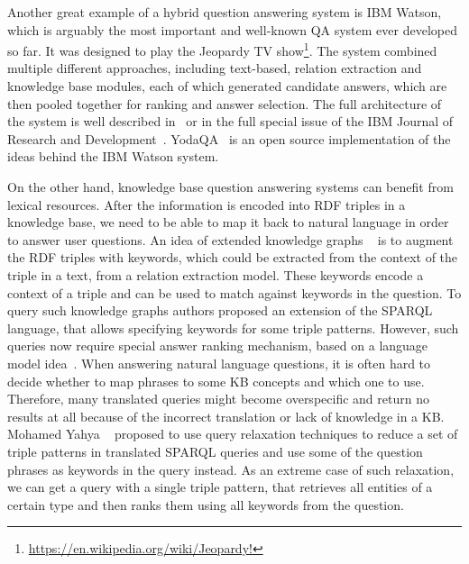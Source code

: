 Another great example of a hybrid question answering system is IBM Watson, which is arguably the most important and well-known QA system ever developed so far.
It was designed to play the Jeopardy TV show\footnote{\href{url}{https://en.wikipedia.org/wiki/Jeopardy!}}.
The system combined multiple different approaches, including text-based, relation extraction and knowledge base modules, each of which generated candidate answers, which are then pooled together for ranking and answer selection.
The full architecture of the system is well described in~\cite{ferrucci2010building} or in the full special issue of the IBM Journal of Research and Development~\cite{ibm_watson_special_issue}.
YodaQA~\cite{baudivs2015yodaqa} is an open source implementation of the ideas behind the IBM Watson system.

On the other hand, knowledge base question answering systems can benefit from lexical resources.
After the information is encoded into RDF triples in a knowledge base, we need to be able to map it back to natural language in order to answer user questions.
An idea of extended knowledge graphs ~\cite{elbassuoni2009language,yahya2013robust} is to augment the RDF triples with keywords, which could be extracted from the context of the triple in a text, \eg from a relation extraction model.
These keywords encode a context of a triple and can be used to match against keywords in the question.
To query such knowledge graphs authors proposed an extension of the SPARQL language, that allows specifying keywords for some triple patterns.
However, such queries now require special answer ranking mechanism, \eg based on a language model idea~\cite{elbassuoni2009language}.
When answering natural language questions, it is often hard to decide whether to map phrases to some KB concepts and which one to use.
Therefore, many translated queries might become overspecific and return no results at all because of the incorrect translation or lack of knowledge in a KB.
Mohamed Yahya \etal~\cite{yahya2013robust,yahya2016relationship} proposed to use query relaxation techniques to reduce a set of triple patterns in translated SPARQL queries and use some of the question phrases as keywords in the query instead.
As an extreme case of such relaxation, we can get a query with a single triple pattern, that retrieves all entities of a certain type and then ranks them using all keywords from the question.

